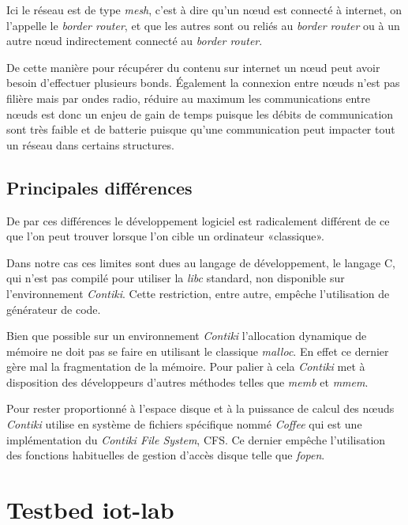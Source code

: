 Ici le réseau est de type \emph{mesh}, c'est à dire qu'un nœud est connecté à internet, on l'appelle le \emph{border router}, et que les autres sont ou reliés au \emph{border router} ou à un autre nœud indirectement connecté au \emph{border router}.


De cette manière pour récupérer du contenu sur internet un nœud peut avoir besoin d'effectuer plusieurs bonds. Également la connexion entre nœuds n'est pas filière mais par ondes radio, réduire au maximum les communications entre nœuds est donc un enjeu de gain de temps puisque les débits de communication sont très faible et de batterie puisque qu'une communication peut impacter tout un réseau dans certains structures.

\subsection{Principales différences}

De par ces différences le développement logiciel est radicalement différent de ce que l'on peut trouver lorsque l'on cible un ordinateur «classique».

Dans notre cas ces limites sont dues au langage de développement, le langage C, qui n'est pas compilé pour utiliser la \emph{libc} standard, non disponible sur l'environnement \emph{Contiki}. Cette restriction, entre autre, empêche l'utilisation de générateur de code.

Bien que possible sur un environnement \emph{Contiki} l'allocation dynamique de mémoire ne doit pas se faire en utilisant le classique \emph{malloc}. En effet ce dernier gère mal la fragmentation de la mémoire. Pour palier à cela \emph{Contiki} met à disposition des développeurs d'autres méthodes telles que \emph{memb} et \emph{mmem}.


Pour rester proportionné à l'espace disque et à la puissance de calcul des nœuds \emph{Contiki} utilise en système de fichiers spécifique nommé \emph{Coffee} qui est une  implémentation du \emph{Contiki File System}, CFS. Ce dernier empêche l'utilisation des fonctions habituelles de gestion d'accès disque telle que \emph{fopen}.



\section{Testbed iot-lab}


